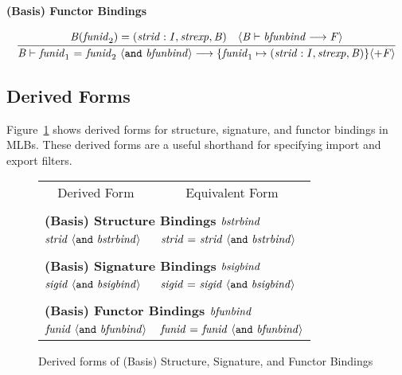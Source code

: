 \vspace{2\parsep}
{\large\noindent
\textbf{(Basis) Functor Bindings} \hfill 
{}
}\nopagebreak

\begin{equation}
\judge{
\mit{B}(\mit{funid}_2) = (\mit{strid}:\mit{I},\mit{strexp},\mit{B}) \quad
\langle\mit{B} \vdash \mit{bfunbind} \longrightarrow \mit{F}\rangle
}{
\mit{B} \vdash \mit{funid}_1 ~\mtt{=}~ \mit{funid}_2 ~\langle\mtt{and}~\mit{bfunbind}\rangle \longrightarrow 
\{\mit{funid}_1 \mapsto (\mit{strid}:\mit{I},\mit{strexp},\mit{B})\} \langle+ \mit{F}\rangle
}
\end{equation}

\subsection{Derived Forms}
\label{sec:mlb:DerivedForms}
Figure~\ref{fig:mlb:DF:bindings} shows derived forms for structure,
signature, and functor bindings in MLBs.  These derived forms are
a useful shorthand for specifying import and export filters.

\begin{figure}[h]
\begin{center}
\begin{tabular}{|l|l|}
\multicolumn{1}{c}{Derived Form} &
\multicolumn{1}{c}{Equivalent Form} \\
\multicolumn{2}{c}{} \\
\multicolumn{2}{l}{\textbf{(Basis) Structure Bindings} $\mit{bstrbind}$} \\
\hline
$\mit{strid} ~\langle\mtt{and}~ \mit{bstrbind}\rangle$ &
$\mit{strid} ~\mtt{=}~ \mit{strid} ~\langle\mtt{and}~ \mit{bstrbind}\rangle$ \\
\hline
\multicolumn{2}{c}{} \\
\multicolumn{2}{l}{\textbf{(Basis) Signature Bindings} $\mit{bsigbind}$} \\
\hline
$\mit{sigid} ~\langle\mtt{and}~ \mit{bsigbind}\rangle$ &
$\mit{sigid} ~\mtt{=}~ \mit{sigid} ~\langle\mtt{and}~ \mit{bsigbind}\rangle$ \\
\hline
\multicolumn{2}{c}{} \\
\multicolumn{2}{l}{\textbf{(Basis) Functor Bindings} $\mit{bfunbind}$} \\
\hline
$\mit{funid} ~\langle\mtt{and}~ \mit{bfunbind}\rangle$ &
$\mit{funid} ~\mtt{=}~ \mit{funid} ~\langle\mtt{and}~ \mit{bfunbind}\rangle$ \\
\hline
\end{tabular}
\end{center}
\caption{Derived forms of (Basis) Structure, Signature, and Functor Bindings}\label{fig:mlb:DF:bindings}
\end{figure}

